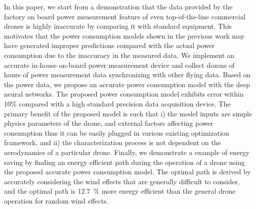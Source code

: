 \documentclass[journal]{./template/IEEEtran}
\begin{document}
In this paper, we start from a demonstration that the data provided by the factory on board power measurement feature of even top-of-the-line commercial drones is highly inaccurate by comparing it with standard equipment. 
This motivates that the power consumption models shown in the previous work may have generated improper predictions compared with the actual power consumption due to the inaccuracy in the measured data.
We implement an accurate in-house on-board power measurement device and collect dozens of hours of power measurement data synchronizing with other flying data. 
Based on the power data, we propose an accurate power consumption model with the deep neural networks. 
The proposed power consumption model exhibits error within 10\% compared with a high standard precision data acquisition device. 
The primary benefit of the proposed model is such that i) the model inputs are simple physics parameters of the drone, and external factors affecting power consumption thus it can be easily plugged in various existing optimization framework, and ii) the characterization process is not dependent on the aerodynamics of a particular drone. %
Finally, we demonstrate a example of energy saving by finding an energy efficient path during the operation of a drone using the proposed accurate power consumption model. The optimal path is derived by accurately considering the wind effects that are generally difficult to consider, and the optimal path is 12.7~\% more energy efficient than the general drone operation for random wind effects.




\begin{table}[ht]
\caption{Comparing the energy consumption between the baseline and the optimal path affected by wind effect in each case.}
\label{tab: opt.result}
\end{table}
\end{document}
